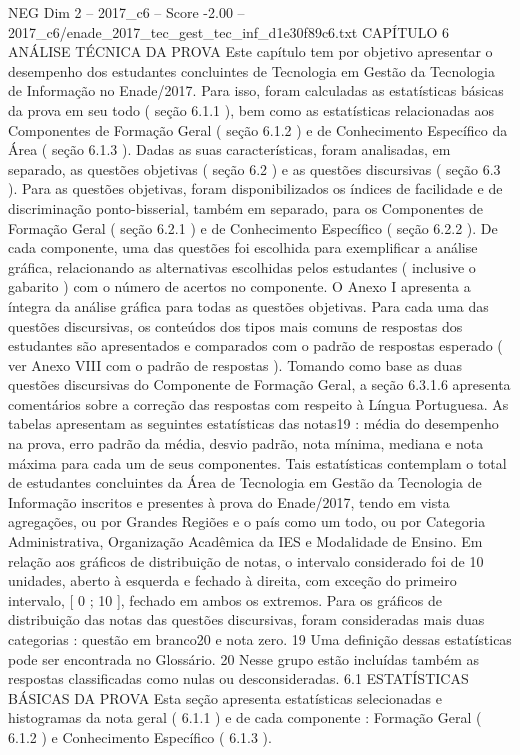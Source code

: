 \begin{textsample}{NEG Dim 2 – 2017\_c6 – Score -2.00 – 2017\_c6/enade\_2017\_tec\_gest\_tec\_inf\_d1e30f89c6.txt}  \label{ex:f2_neg_170}
CAPÍTULO 6 ANÁLISE TÉCNICA DA PROVA Este capítulo tem por objetivo apresentar o desempenho dos estudantes concluintes de Tecnologia em Gestão da Tecnologia de Informação no Enade/2017.
Para isso, foram calculadas as estatísticas básicas da prova em seu todo ( seção 6.1.1 ), bem como as estatísticas relacionadas aos Componentes de Formação Geral ( seção 6.1.2 ) e de Conhecimento Específico da Área ( seção 6.1.3 ).
Dadas as suas características, foram analisadas, em separado, as questões objetivas ( seção 6.2 ) e as questões discursivas ( seção 6.3 ).
Para as questões objetivas, foram disponibilizados os índices de facilidade e de discriminação ponto-bisserial, também em separado, para os Componentes de Formação Geral ( seção 6.2.1 ) e de Conhecimento Específico ( seção 6.2.2 ).
De cada componente, uma das questões foi escolhida para exemplificar a análise gráfica, relacionando as alternativas escolhidas pelos estudantes ( inclusive o gabarito ) com o número de acertos no componente.
O Anexo I apresenta a íntegra da análise gráfica para todas as questões objetivas.
Para cada uma das questões discursivas, os conteúdos dos tipos mais comuns de respostas dos estudantes são apresentados e comparados com o padrão de respostas esperado ( ver Anexo VIII com o padrão de respostas ).
Tomando como base as duas questões discursivas do Componente de Formação Geral, a seção 6.3.1.6 apresenta comentários sobre a correção das respostas com respeito à Língua Portuguesa.
As tabelas apresentam as seguintes estatísticas das notas19 : média do desempenho na prova, erro padrão da média, desvio padrão, nota mínima, mediana e nota máxima para cada um de seus componentes.
Tais estatísticas contemplam o total de estudantes concluintes da Área de Tecnologia em Gestão da Tecnologia de Informação inscritos e presentes à prova do Enade/2017, tendo em vista agregações, ou por Grandes Regiões e o país como um todo, ou por Categoria Administrativa, Organização Acadêmica da IES e Modalidade de Ensino.
Em relação aos gráficos de distribuição de notas, o intervalo considerado foi de 10 unidades, aberto à esquerda e fechado à direita, com exceção do primeiro intervalo, [ 0 ; 10 ], fechado em ambos os extremos.
Para os gráficos de distribuição das notas das questões discursivas, foram consideradas mais duas categorias : questão em branco20 e nota zero. 19 Uma definição dessas estatísticas pode ser encontrada no Glossário. 20 Nesse grupo estão incluídas também as respostas classificadas como nulas ou desconsideradas. 6.1 ESTATÍSTICAS BÁSICAS DA PROVA Esta seção apresenta estatísticas selecionadas e histogramas da nota geral ( 6.1.1 ) e de cada componente : Formação Geral ( 6.1.2 ) e Conhecimento Específico ( 6.1.3 ).

\end{textsample}
